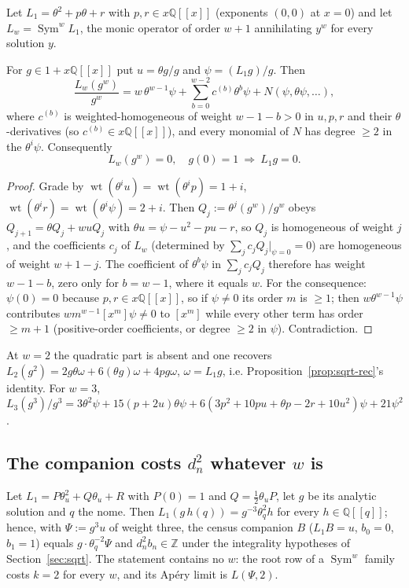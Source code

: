 Let $L_1=\theta^2+p\theta+r$ with $p,r\in x\mathbb Q[[x]]$ (exponents $(0,0)$ at $x=0$) and
let $L_w=\operatorname{Sym}^wL_1$, the monic operator of order $w+1$ annihilating $y^w$ for
every solution $y$.

\begin{theorem}[descent]\label{thm:descent}
\Proved{} For $g\in1+x\mathbb Q[[x]]$ put $u=\theta g/g$ and $\psi=(L_1g)/g$. Then
\[
\frac{L_w(g^w)}{g^w}
= w\,\theta^{w-1}\psi+\sum_{b=0}^{w-2}c^{(b)}\theta^b\psi+N(\psi,\theta\psi,\dots),
\]
where $c^{(b)}$ is weighted-homogeneous of weight $w-1-b>0$ in $u,p,r$ and their
$\theta$-derivatives \textup{(}so $c^{(b)}\in x\mathbb Q[[x]]$\textup{)}, and every monomial
of $N$ has degree $\ge2$ in the $\theta^i\psi$. Consequently
\[
L_w(g^w)=0,\quad g(0)=1\ \Longrightarrow\ L_1g=0 .
\]
\end{theorem}
\begin{proof}
Grade by $\operatorname{wt}(\theta^iu)=\operatorname{wt}(\theta^ip)=1+i$,
$\operatorname{wt}(\theta^ir)=\operatorname{wt}(\theta^i\psi)=2+i$. Then
$Q_j:=\theta^j(g^w)/g^w$ obeys $Q_{j+1}=\theta Q_j+wuQ_j$ with $\theta u=\psi-u^2-pu-r$, so
$Q_j$ is homogeneous of weight $j$, and the coefficients $c_j$ of $L_w$ (determined by
$\sum_jc_jQ_j|_{\psi=0}=0$) are homogeneous of weight $w+1-j$. The coefficient of
$\theta^b\psi$ in $\sum_jc_jQ_j$ therefore has weight $w-1-b$, zero only for $b=w-1$, where
it equals $w$. For the consequence: $\psi(0)=0$ because $p,r\in x\mathbb Q[[x]]$, so if
$\psi\neq0$ its order $m$ is $\ge1$; then $w\theta^{w-1}\psi$ contributes $wm^{w-1}[x^m]\psi\ne0$
to $[x^m]$ while every other term has order $\ge m+1$ (positive-order coefficients, or degree
$\ge2$ in $\psi$). Contradiction.
\end{proof}

At $w=2$ the quadratic part is absent and one recovers
$L_2(g^2)=2g\theta\omega+6(\theta g)\omega+4pg\omega$, $\omega=L_1g$, i.e.
Proposition~\ref{prop:sqrt-rec}'s identity. For $w=3$,
$L_3(g^3)/g^3=3\theta^2\psi+15(p+2u)\theta\psi+6(3p^2+10pu+\theta p-2r+10u^2)\psi+21\psi^2$.

\subsection{The companion costs $d_n^2$ whatever $w$ is}

\begin{theorem}\label{thm:rootfreeint}
\Proved{} Let $L_1=P\theta_u^2+Q\theta_u+R$ with $P(0)=1$ and $Q=\tfrac12\theta_uP$, let $g$
be its analytic solution and $q$ the nome. Then $L_1(g\,h(q))=g^{-3}\theta_q^2h$ for every
$h\in\mathbb Q[[q]]$; hence, with $\Psi:=g^3u$ of weight three, the census companion
$B$ \textup{(}$L_1B=u$, $b_0=0$, $b_1=1$\textup{)} equals $g\cdot\theta_q^{-2}\Psi$ and
$d_n^2b_n\in\mathbb Z$ under the integrality hypotheses of Section~\ref{sec:sqrt}. The
statement contains no $w$: the root row of a $\operatorname{Sym}^w$ family costs $k=2$ for
every $w$, and its Apéry limit is $L(\Psi,2)$.
\end{theorem}

